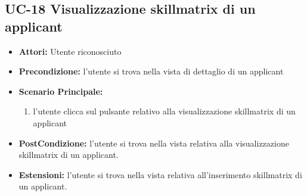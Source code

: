 \subsection{UC-18 Visualizzazione skillmatrix di un applicant}
\begin{itemize}
\item \textbf{Attori:} Utente riconosciuto
\item \textbf{Precondizione:}  l'utente si trova nella vista di dettaglio di un applicant
\item \textbf{Scenario Principale:}
\begin{enumerate}
	\item l'utente clicca sul pulsante relativo alla visualizzazione skillmatrix di un applicant
\end{enumerate}
\item \textbf{PostCondizione:} l'utente si trova nella vista relativa alla visualizzazione skillmatrix di un applicant.
\item \textbf{Estensioni:} l'utente si trova nella vista relativa all'inserimento skillmatrix di un applicant.
\end{itemize}